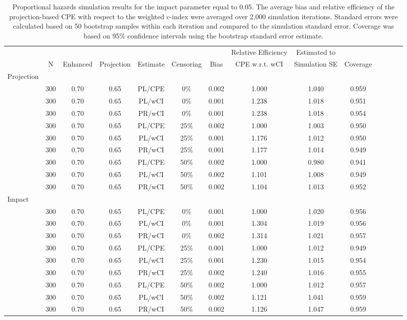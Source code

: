 \documentclass[12pt]{article}
\begin{document}
 \begin{table}[ht]
 \caption{Proportional hazards simulation results for the impact parameter equal to 0.05.
  The average bias and relative efficiency of the projection-based CPE with respect to the weighted c-index were averaged over 2,000 simulation iterations. Standard errors were calculated based on 50 bootstrap samples within each iteration and compared to the simulation standard error. Coverage was based on 95\% confidence intervals using the bootstrap standard error estimate. }
\centering
\tiny
\begin{tabular}{lccccccccccccc} \label{PHsimresultsDelta005}
\vspace{-0.25cm}
   &&&&&& & Relative Efficiency  & Estimated to  &\\
& N & Enhanced &  Projection & Estimate & Censoring &Bias & CPE w.r.t. wCI & Simulation SE & Coverage \\
 \hline
 \hline
  Projection &&&&&&&&& \\
& 300 &0.70 & 0.65 & PL/CPE & 0\% & 0.002 & 1.000 & 1.040 & 0.959 \\ 
& 300 &0.70 & 0.65 & PL/wCI &0\%  & 0.001 & 1.238 & 1.018 & 0.951 \\ 
& 300 &0.70 & 0.65 & PR/wCI &0\%  & 0.001 & 1.238 & 1.018 & 0.954 \\  
\hline
& 300 &0.70 & 0.65 & PL/CPE  &25\% & 0.002 & 1.000 & 1.003 & 0.950 \\ 
& 300 &0.70 & 0.65 & PL/wCI &25\%  & 0.001 & 1.176 & 1.012 & 0.950 \\ 
& 300 &0.70 & 0.65 & PR/wCI &25\%  & 0.001 & 1.177 & 1.014 & 0.949 \\ 
\hline
& 300 &0.70 & 0.65 & PL/CPE  &50\%  & 0.002 & 1.000 & 0.980 & 0.941 \\ 
& 300 &0.70 & 0.65 & PL/wCI &50\%  & 0.002 & 1.101 & 1.008 & 0.949 \\ 
& 300 &0.70 & 0.65 & PR/wCI &50\%  &  0.002 & 1.104 & 1.013 & 0.952 \\
  \hline
  \hline
  Impact &&&&&&&&& \\
&    300 &0.70 & 0.65 & PL/CPE   &0\%  &0.001 & 1.000 & 1.020 & 0.956 \\ 
& 300 &0.70 & 0.65 & PL/wCI &0\%  &  0.001 & 1.304 & 1.019 & 0.956 \\ 
& 300 &0.70 & 0.65 & PR/wCI &0\%  &  0.002 & 1.314 & 1.021 & 0.957 \\ 
\hline
&   300 &0.70 & 0.65 & PL/CPE   &25\%  &0.001 & 1.000 & 1.012 & 0.949 \\ 
& 300 &0.70 & 0.65 & PL/wCI &25\%  & 0.001 & 1.230 & 1.015 & 0.954 \\ 
& 300 &0.70 & 0.65 & PR/wCI &25\%  & 0.002 & 1.240 & 1.016 & 0.955 \\ 
\hline
& 300 &0.70 & 0.65 & PL/CPE   &50\%  & 0.002 & 1.000 & 1.012 & 0.957 \\ 
& 300 &0.70 & 0.65 & PL/wCI &50\% & 0.002 & 1.121 & 1.041 & 0.959 \\
& 300 &0.70 & 0.65 & PR/wCI &50\% &  0.002 & 1.126 & 1.047 & 0.959 \\ 
  \hline
  \hline
\end{tabular}
\end{table}
\end{document}
